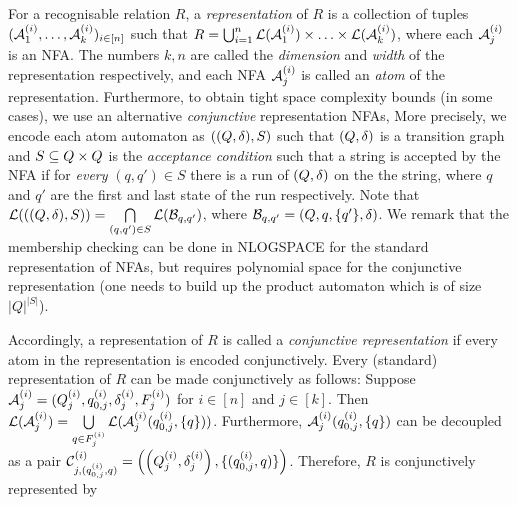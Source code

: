 For a recognisable relation $R$,  a \emph{representation} of $R$ is a collection of tuples $(\mathcal{A}^{(i)}_1, \ldots, \mathcal{A}^{(i)}_k)_{i\in [n]}$  such that 
$R = \bigcup_{i=1}^n \mathcal{L}(\mathcal{A}^{(i)}_1) \times \ldots\times \mathcal{L}(\mathcal{A}^{(i)}_k)$, where each $\mathcal{A}^{(i)}_j$ is an NFA. The numbers $k, n$ are called the \emph{dimension} and \emph{width}  of the representation respectively, and each NFA $\mathcal{A}^{(i)}_j$ is called an \emph{atom} of the representation.
%
Furthermore, to obtain tight space complexity bounds (in some cases), we use an alternative  \emph{conjunctive} representation NFAs, %
More precisely, we encode each atom automaton as $((Q, \delta), S)$ such that $(Q, \delta)$ is a transition graph and $S \subseteq Q \times Q$ is the \emph{acceptance condition} such that a string is accepted by the NFA if for \emph{every} $(q, q') \in S$ there is a run of $(Q, \delta)$ on the the string, where $q$ and $q'$ are the first and last state of the run respectively. 
%
Note that $\mathcal{L}(((Q, \delta), S)) = \bigcap \limits_{(q,q') \in S} \mathcal{L}(\mathcal{B}_{q,q'})$, where $\mathcal{B}_{q,q'} = (Q, q, \{q'\}, \delta)$. 
We remark that the membership checking  can be done in NLOGSPACE for the standard representation of NFAs, but requires polynomial space for the conjunctive representation (one needs to build up the product automaton which is of size $|Q|^{|S|}$). 

%
Accordingly, a representation of $R$ is called a \emph{conjunctive representation} if every atom in the representation is encoded conjunctively.
Every (standard) representation of $R$  can be made conjunctively as follows: 
Suppose $\mathcal{A}^{(i)}_j=(Q^{(i)}_j, q^{(i)}_{0,j}, \delta^{(i)}_j, F^{(i)}_j)$ for $i \in [n]$ and $j \in [k]$. Then $\mathcal{L}(\mathcal{A}^{(i)}_j) = \bigcup \limits_{q \in F^{(i)}_j} \mathcal{L}(\mathcal{A}^{(i)}_j(q^{(i)}_{0,j}, \{q\}))$. Furthermore,  $\mathcal{A}^{(i)}_j(q^{(i)}_{0, j}, \{q\})$ can be decoupled as a pair $\mathcal{C}^{(i)}_{j, (q^{(i)}_{0, j}, q)} = \left(\left(Q^{(i)}_j,  \delta^{(i)}_j \right), \{(q^{(i)}_{0,j}, q)\} \right)$. Therefore, $R$ is conjunctively represented by 
%

